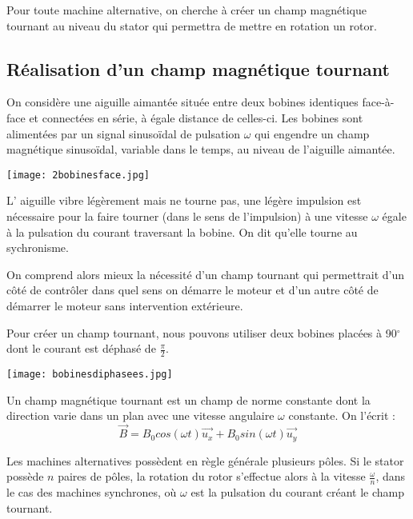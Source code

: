 \documentclass{article}
\begin{document}

Pour toute machine alternative, on cherche à créer un champ magnétique tournant au niveau du stator qui permettra de mettre en rotation un rotor. 

\subsection{Réalisation d'un champ magnétique tournant}
On considère une aiguille aimantée située entre deux bobines identiques face-à-face et connectées en série, à égale distance de celles-ci. Les bobines sont alimentées par un signal sinusoïdal de pulsation $\omega$ qui engendre un champ magnétique sinusoïdal, variable dans le temps, au niveau de l'aiguille aimantée. 


\begin{center}
    \texttt{[image: 2bobinesface.jpg]}
\end{center}


L' aiguille vibre légèrement mais ne tourne pas, une légère impulsion est nécessaire pour la faire tourner (dans le sens de l'impulsion) à une vitesse $\omega$ égale à la pulsation du courant traversant la bobine. On dit qu'elle tourne au sychronisme. 

On comprend alors mieux la nécessité d'un champ tournant qui permettrait d'un côté de contrôler dans quel sens on démarre le moteur et d'un autre côté de démarrer le moteur sans intervention extérieure. 

\medskip

Pour créer un champ tournant, nous pouvons utiliser deux bobines placées à 90$^\circ$ dont le courant est déphasé de $\frac{\pi}{2}$. 

\begin{center}
    \texttt{[image: bobinesdiphasees.jpg]}
\end{center}

Un champ magnétique tournant est un champ de norme constante dont la direction varie dans un plan avec une vitesse angulaire $\omega$ constante. On l'écrit : 
\begin{equation}
    \vec{B} = B_0 cos(\omega t)\vec{u_x} + B_0 sin(\omega t)\vec{u_y}
\end{equation}

Les machines alternatives possèdent en règle générale plusieurs pôles. Si le stator possède $n$ paires de pôles, la rotation du rotor s'effectue alors à la vitesse $\frac{\omega}{n}$, dans le cas des machines synchrones, où $\omega$ est la pulsation du courant créant le champ tournant.
\end{document}
